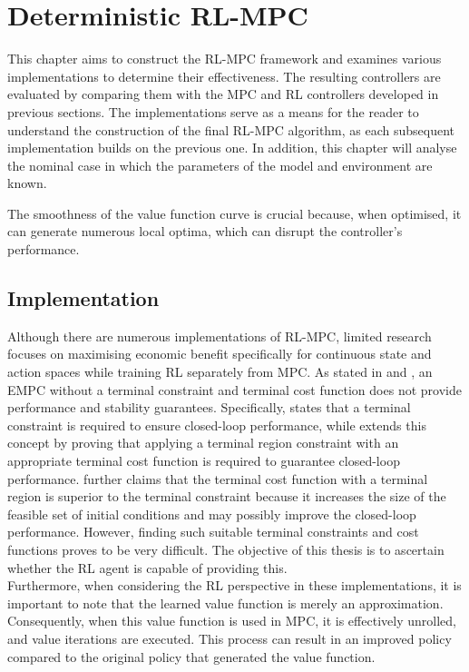 \chapter{Deterministic RL-MPC}
\label{chapter:deterministic_RL_MPC}
This chapter aims to construct the RL-MPC framework and examines various implementations to determine their effectiveness. The resulting controllers are evaluated by comparing them with the MPC and RL controllers developed in previous sections. The implementations serve as a means for the reader to understand the construction of the final RL-MPC algorithm, as each subsequent implementation builds on the previous one. In addition, this chapter will analyse the nominal case in which the parameters of the model and environment are known.

The smoothness of the value function curve is crucial because, when optimised, it can generate numerous local optima, which can disrupt the controller’s performance.


\section{Implementation} \label{section:rlmpc implementation}
Although there are numerous implementations of RL-MPC, limited research focuses on maximising economic benefit specifically for continuous state and action spaces while training RL separately from MPC. As stated in \citet{ellisTutorialReviewEconomic2014} and \citet{amritEconomicOptimizationUsing2011}, an EMPC without a terminal constraint and terminal cost function does not provide performance and stability guarantees. Specifically, \citet{ellisTutorialReviewEconomic2014} states that a terminal constraint is required to ensure closed-loop performance, while \citet{amritEconomicOptimizationUsing2011} extends this concept by proving that applying a terminal region constraint with an appropriate terminal cost function is required to guarantee closed-loop performance.\citet{amritEconomicOptimizationUsing2011} further claims that the terminal cost function with a terminal region is superior to the terminal constraint because it increases the size of the feasible set of initial conditions and may possibly improve the closed-loop performance. However, finding such suitable terminal constraints and cost functions proves to be very difficult. The objective of this thesis is to ascertain whether the RL agent is capable of providing this. \\
Furthermore, when considering the RL perspective in these implementations, it is important to note that the learned value function is merely an approximation. Consequently, when this value function is used in MPC, it is effectively unrolled, and value iterations are executed. This process can result in an improved policy compared to the original policy that generated the value function.

